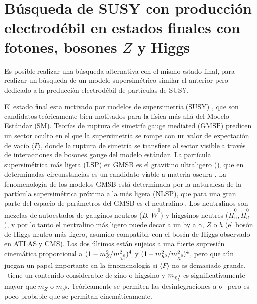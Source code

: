 \chapter{Búsqueda de SUSY con producción electrodébil en estados finales con fotones, bosones $Z$ y Higgs}\label{cap:analysis_EWK}



Es posible realizar una búsqueda alternativa con el mismo estado final, para realizar un búsqueda de un modelo supersimétrico similar al anterior pero dedicado a la preducción electrodébil de partículas de SUSY.

El estado final esta motivado por modelos de supersimetría (SUSY) \cite{Golfand:1971iw, Volkov:1973ix, Wess:1974tw, Wess:1974jb, Ferrara:1974pu, Salam:1974ig, Martin:1997ns}, que son candidatos teóricamente bien motivados para la física más allá del Modelo Estándar (SM). Teorías de ruptura de simetría gauge mediated (GMSB) \cite{Dine:1981gu, AlvarezGaume:1981wy, Nappi:1982hm} predicen un sector oculto en el que la supersimetría se rompe con un valor de expectación de vacío $ \langle F \rangle $, donde la ruptura de simetría se transfiere al sector visible a través de interacciones de bosones gauge del modelo estándar. La partícula supersimétrica más ligera (LSP) en GMSB es el gravitino ultraligero (\gravino), que en determinadas circunstancias es un candidato viable a materia oscura \cite{Goldberg:1983nd, Ellis:1983ew}. La fenomenología de los modelos GMSB está determinada por la naturaleza de la partícula supersimétrica próxima a la más ligera (NLSP), que para una gran parte del espacio de parámetros del GMSB es el neutralino \ninoone. Los neutralinos son mezclas de autoestados de gauginos neutros ($\tilde{B}$, $\tilde{W}^{0}$) y higgsinos neutros ($\tilde{H}^{0}_{u},\tilde{H}^{0}_{d}$), y por lo tanto el neutralino más ligero puede decar a un \gravino by a $\gamma$, $Z$ o $h$ (el bosón de Higgs neutro más ligero, asumido compatible con el bosón de Higgs observado en ATLAS y CMS). Los dos últimos están sujetos a una fuerte supresión cinemática proporcional a $ (1-m_{Z}^{2}/m_{\ninoone}^{2})^4$ y $(1-m_{h^{0}}^{2}/m_{\ninoone}^{2})^4$, pero que aún juegan un papel importante en la fenomenología si $ \langle F \rangle $ no es demasiado grande, \ninoone\ tiene un contenido considerable de zino o higgsino y $m_{\ninoone}$ es significativamente mayor que $m_{Z}$ o $m_{h^{0}}$. Teóricamente se permiten las desintegraciones a \Azero o \Hzero \, pero es poco probable que se permitan cinemáticamente.


